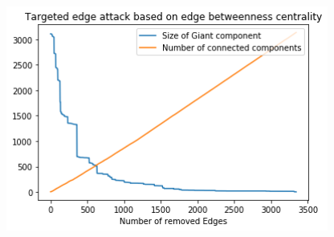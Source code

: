 \documentclass{Resources/netsci-project}
\begin{document}
\begin{center}
    \centering
    \includegraphics[width=300pt]{Resources/edge_targeted_attacks}
    \label{fig:EdgeTargetedAttacks}
\end{center}
\end{document}
